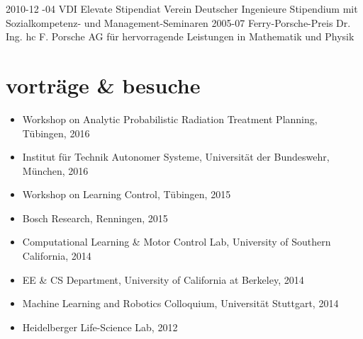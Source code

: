 \documentclass[a4paper]{k-cv} %
\begin{document}
\begin{entrylist}
\entry
{2010-12 -04}
{VDI Elevate Stipendiat}
{Verein Deutscher Ingenieure}
{Stipendium mit Sozialkompetenz- und Management-Seminaren}
\entry
{2005-07}
{Ferry-Porsche-Preis}
{Dr. Ing. hc F. Porsche AG}
{für hervorragende Leistungen in Mathematik und Physik}
\end{entrylist}

\clearpage



\section{vorträge \& besuche} \bodyfont
\begin{itemize}
 \item Workshop on Analytic Probabilistic Radiation Treatment Planning, 
    Tübingen, 2016
 \item Institut für Technik Autonomer Systeme, Universität der Bundeswehr, 
    München, 2016
 \item Workshop on Learning Control, Tübingen, 2015
 \item Bosch Research, Renningen, 2015
 \item Computational Learning \& Motor Control Lab, University of Southern
    California, 2014
 \item EE \& CS Department, University of California at Berkeley, 2014
 \item Machine Learning and Robotics Colloquium, Universität Stuttgart, 2014
 \item Heidelberger Life-Science Lab, 2012
\end{itemize}
\end{document}
